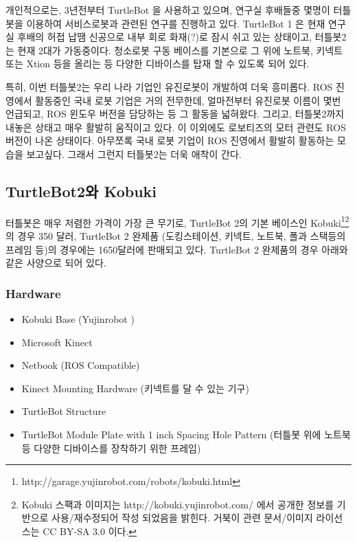 개인적으로는, 3년전부터 TurtleBot 을 사용하고 있으며, 연구실 후배들중 몇명이 터틀봇을 이용하여 서비스로봇과 관련된 연구를 진행하고 있다. TurtleBot 1 은 현재 연구실 후배의 허접 납땜 신공으로 내부 회로 화재(?)로 잠시 쉬고 있는 상태이고, 터틀봇2는 현재 2대가 가동중이다. 청소로봇 구동 베이스를 기본으로 그 위에 노트북, 키넥트 또는 Xtion 등을 올리는 등 다양한 디바이스를 탑재 할 수 있도록 되어 있다. 

특히, 이번 터틀봇2는 우리 나라 기업인 유진로봇이 개발하여 더욱 흥미롭다. ROS 진영에서 활동중인 국내 로봇 기업은 거의 전무한데, 얼마전부터 유진로봇 이름이 몇번 언급되고, ROS 윈도우 버전을 담당하는 등 그 활동을 넓혀왔다. 그리고, 터틀봇2까지 내놓은 상태고 매우 활발히 움직이고 있다. 이 이외에도 로보티즈의 모터 관련도 ROS 버전이 나온 상태이다. 아무쪼록 국내 로봇 기업이 ROS 진영에서 활발히 활동하는 모습을 보고싶다. 그래서 그런지 터틀봇2는 더욱 애착이 간다.

\subsection{TurtleBot2와 Kobuki}

터틀봇은 매우 저렴한 가격이 가장 큰 무기로, TurtleBot 2의 기본 베이스인 Kobuki\footnote{http://garage.yujinrobot.com/robots/kobuki.html}\footnote{Kobuki 스팩과 이미지는 http://kobuki.yujinrobot.com/ 에서 공개한 정보를 기반으로 사용/재수정되어 작성 되었음을 밝힌다. 거북이 관련 문서/이미지 라이선스는 CC BY-SA 3.0 이다.} 의 경우 350 달러, TurtleBot 2 완제품 (도킹스테이션, 키넥트, 노트북, 폴과 스택등의 프레임 등)의 경우에는 1650달러에 판매되고 있다. TurtleBot 2 완제품의 경우 아래와 같은 사양으로 되어 있다.

\subsubsection{Hardware}

\begin{itemize}[leftmargin=*]
\item Kobuki Base (Yujinrobot )
\item Microsoft Kinect
\item Netbook (ROS Compatible)
\item Kinect Mounting Hardware (키넥트를 달 수 있는 기구)
\item TurtleBot Structure
\item TurtleBot Module Plate with 1 inch Spacing Hole Pattern (터틀봇 위에 노트북 등 다양한 디바이스를 장착하기 위한 프레임)
\end{itemize}

